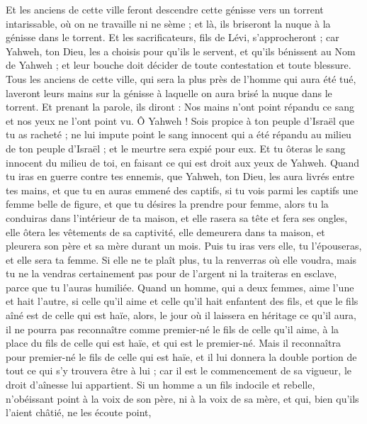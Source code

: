 \begin{multicols}{2}
Et les anciens de cette ville feront descendre cette génisse vers un torrent intarissable, où on ne travaille ni ne sème ; et là, ils briseront la nuque à la génisse dans le torrent.
Et les sacrificateurs, fils de Lévi, s'approcheront ; car Yahweh, ton Dieu, les a choisis pour qu'ils le servent, et qu'ils bénissent au Nom de Yahweh ; et leur bouche doit décider de toute contestation et toute blessure.
Tous les anciens de cette ville, qui sera la plus près de l'homme qui aura été tué, laveront leurs mains sur la génisse à laquelle on aura brisé la nuque dans le torrent.
Et prenant la parole, ils diront : Nos mains n'ont point répandu ce sang et nos yeux ne l'ont point vu.
Ô Yahweh ! Sois propice à ton peuple d'Israël que tu as racheté ; ne lui impute point le sang innocent qui a été répandu au milieu de ton peuple d'Israël ; et le meurtre sera expié pour eux.
Et tu ôteras le sang innocent du milieu de toi, en faisant ce qui est droit aux yeux de Yahweh.
Quand tu iras en guerre contre tes ennemis, que Yahweh, ton Dieu, les aura livrés entre tes mains, et que tu en auras emmené des captifs,
si tu vois parmi les captifs une femme belle de figure, et que tu désires la prendre pour femme,
alors tu la conduiras dans l'intérieur de ta maison, et elle rasera sa tête et fera ses ongles,
elle ôtera les vêtements de sa captivité, elle demeurera dans ta maison, et pleurera son père et sa mère durant un mois. Puis tu iras vers elle, tu l'épouseras, et elle sera ta femme.
Si elle ne te plaît plus, tu la renverras où elle voudra, mais tu ne la vendras certainement pas pour de l'argent ni la traiteras en esclave, parce que tu l'auras humiliée.
Quand un homme, qui a deux femmes, aime l'une et hait l'autre, si celle qu'il aime et celle qu'il hait enfantent des fils, et que le fils aîné est de celle qui est haïe,
alors, le jour où il laissera en héritage ce qu'il aura, il ne pourra pas reconnaître comme premier-né le fils de celle qu'il aime, à la place du fils de celle qui est haïe, et qui est le premier-né.
Mais il reconnaîtra pour premier-né le fils de celle qui est haïe, et il lui donnera la double portion de tout ce qui s'y trouvera être à lui ; car il est le commencement de sa vigueur, le droit d'aînesse lui appartient.
Si un homme a un fils indocile et rebelle, n'obéissant point à la voix de son père, ni à la voix de sa mère, et qui, bien qu'ils l'aient châtié, ne les écoute point,

\end{multicols}
